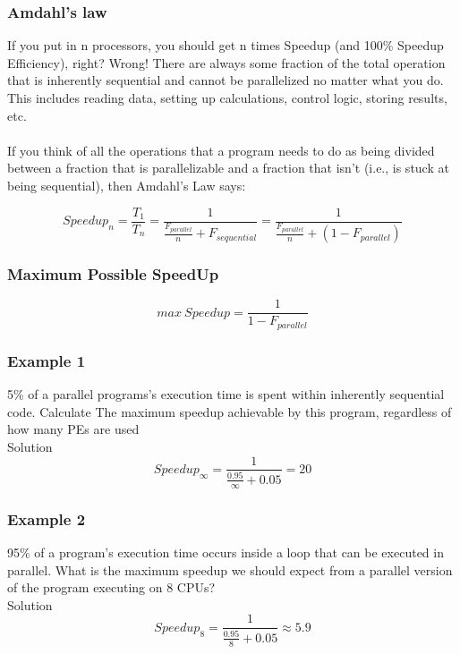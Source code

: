 \documentclass[12pt, a4paper]{book}
\begin{document}
\subsubsection{Amdahl's law}
If you put in n processors, you should get n times Speedup
(and 100\% Speedup Efficiency), right? Wrong!
There are always some fraction of the total operation that is inherently
sequential and cannot be parallelized no matter what you do. This includes
reading data, setting up calculations, control logic, storing results, etc. \\ \\
If you think of all the operations that a program needs to do as being
divided between a fraction that is parallelizable and a fraction that isn't
(i.e., is stuck at being sequential), then Amdahl's Law says:

\begin{equation}
    Speedup_n = \frac{T_1}{T_n} = \frac{1}{\frac{F_{parallel}}{n}+F_{sequential}} = \frac{1}{\frac{F_{parallel}}{n}+(1-F_{parallel})}
\end{equation}

\subsubsection{Maximum Possible SpeedUp}
\begin{equation}
    max\ Speedup = \frac{1}{1-F_{parallel}}
\end{equation}
\subsubsection{Example 1}
5\% of a parallel programs's execution time is spent within inherently sequential code.
Calculate The maximum speedup achievable by this program, regardless of how many PEs are used \\
Solution \\
\begin{equation}
    Speedup_\infty = \frac{1}{\frac{0.95}{\infty}+0.05} = 20
\end{equation}
\subsubsection{Example 2}
95\% of a program's execution time occurs inside a loop
that can be executed in parallel. What is the maximum
speedup we should expect from a parallel version of the
program executing on 8 CPUs? \\
Solution \\
\begin{equation}
    Speedup_8 = \frac{1}{\frac{0.95}{8}+0.05} \approx 5.9
\end{equation}
\end{document}
